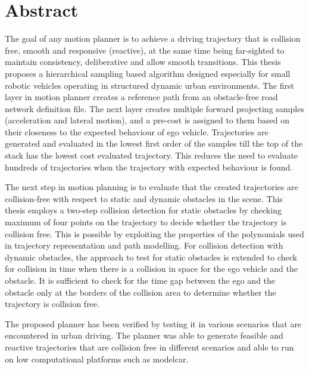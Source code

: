 \chapter*{Abstract}
The goal of any motion planner is to achieve a driving trajectory that is collision free, smooth and responsive (reactive), at the same time being far-sighted to maintain consistency, deliberative and allow smooth transitions. This thesis proposes a hierarchical sampling based algorithm designed especially for small robotic vehicles operating in structured dynamic urban environments. The first layer in motion planner creates a reference path from an obstacle-free road network definition file. The next layer creates multiple forward projecting samples (acceleration and lateral motion), and a pre-cost is assigned to them based on their closeness to the expected behaviour of ego vehicle. Trajectories are generated and evaluated in the lowest first order of the samples till the top of the stack has the lowest cost evaluated trajectory. This reduces the need to evaluate hundreds of trajectories when the trajectory with expected behaviour is found. 

The next step in motion planning is to evaluate that the created trajectories are collision-free with respect to static and dynamic obstacles in the scene. This thesis employs a two-step collision detection for static obstacles by checking maximum of four points on the trajectory to decide whether the trajectory is collision free. This is possible by exploiting the properties of the polynomials used in trajectory representation and path modelling. For collision detection with dynamic obstacles, the approach to test for static obstacles is extended to check for collision in time when there is a collision in space for the ego vehicle and the obstacle. It is sufficient to check for the time gap between the ego and the obstacle only at the borders of the collision area to determine whether the trajectory is collision free. 

The proposed planner has been verified by testing it in various scenarios that are encountered in urban driving. The planner was able to generate feasible and reactive trajectories that are collision free in different scenarios and able to run on low computational platforms such as modelcar. 

